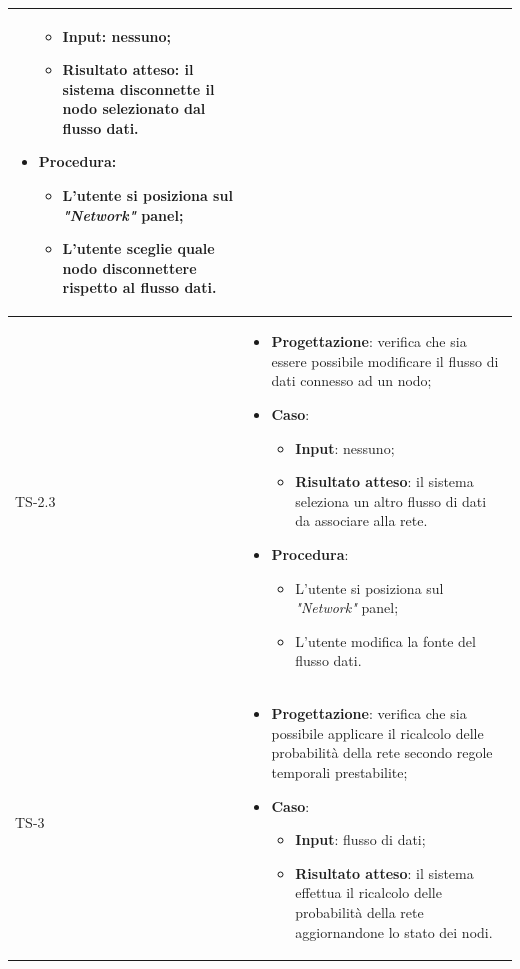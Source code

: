 \begin{longtable}{|C{2.5cm}|C{13cm}|}
\begin{itemize}
	\begin{itemize}
		\item \textbf{Input}: nessuno;
		\item \textbf{Risultato atteso}: il sistema disconnette il nodo selezionato dal flusso dati.
	\end{itemize}
	\item \textbf{Procedura}:
	\begin{itemize}
		\item L'utente si posiziona sul \emph{"Network"} panel;
		\item L'utente sceglie quale nodo disconnettere rispetto al flusso dati.
	\end{itemize} 
\end{itemize}
	 \\
	\hline
	{TS-2.3} &
\begin{itemize}
	\item \textbf{Progettazione}: verifica che sia essere possibile modificare il
	flusso di dati connesso ad un nodo;
	\item \textbf{Caso}: 
	\begin{itemize}
		\item \textbf{Input}: nessuno;
		\item \textbf{Risultato atteso}: il sistema  seleziona un altro flusso di dati da associare alla rete.
	\end{itemize}
	\item \textbf{Procedura}:
	\begin{itemize}
		\item L'utente si posiziona sul \emph{"Network"} panel;
		\item L'utente modifica la fonte del flusso dati.
	\end{itemize} 
\end{itemize}	
	  \\
	\hline
	{TS-3} & 
\begin{itemize}
	\item \textbf{Progettazione}: verifica che sia possibile applicare il
	ricalcolo delle probabilità della rete secondo regole temporali prestabilite;
	\item \textbf{Caso}: 
	\begin{itemize}
		\item \textbf{Input}: flusso di dati;
		\item \textbf{Risultato atteso}: il sistema effettua il ricalcolo delle probabilità della
		rete aggiornandone lo stato dei nodi.
	\end{itemize}

\end{itemize}
\end{longtable}
